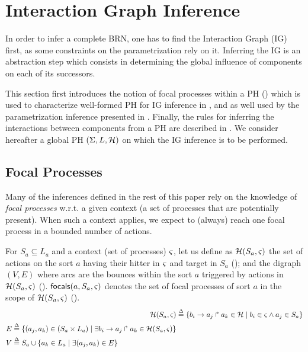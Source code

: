 \section{Interaction Graph Inference}\label{sec:infer-IG}

In order to infer a complete BRN, one has to find the Interaction Graph (IG) first, as some
constraints on the parametrization rely on it.
Inferring the IG is an abstraction step which consists in determining the global influence of
components on each of its successors.

This section first introduces the notion of focal processes within a PH
() which is used to characterize well-formed PH for IG inference
in , and as well used by the parametrization inference presented in .
Finally, the rules for inferring the interactions between components from a PH are
described in .
We consider hereafter a global PH $(\Sigma,L,\mathcal{H})$ on which the IG inference is to be
performed.



\subsection{Focal Processes}\label{ssec:focal}

Many of the inferences defined in the rest of this paper rely on the knowledge of \emph{focal
processes} w.r.t. a given context (a set of processes that are potentially present).
When such a context applies, we expect to (always) reach one focal process in a bounded number of
actions.

For $S_a\subseteq L_a$ and a context (set of processes) $\varsigma$, let us define as $\mathcal{H}(S_a,\varsigma)$
the set of actions on the sort $a$ having their hitter in $\varsigma$ and target in $S_a$
();
and the digraph $(V, E)$ where arcs are the bounces within the sort $a$ triggered by actions
in $\mathcal{H}(S_a,\varsigma)$ ().
$\mathsf{focals}(a,S_a,\varsigma)$ denotes the set of focal processes of sort $a$ in the scope of
$\mathcal{H}(S_a,\varsigma)$ ().
\begin{align}
\mathcal{H}(S_a,\varsigma) & \stackrel{\Delta}= \{ b_i\rightarrow a_j\Rsh a_k\in\mathcal{H} \mid b_i\in\varsigma \wedge a_j\in S_a \}
\label{eq:PHa-ctx}
\\
\begin{split}
E  & \stackrel{\Delta}= \{(a_j,a_k)\in (S_a \times L_a) \mid 
			\exists b_i\rightarrow a_j\Rsh a_k\in \mathcal{H}(S_a,\varsigma) \}
\\
V & \stackrel{\Delta}= S_a \cup \{ a_k\in L_a\mid \exists (a_j,a_k)\in E\}
\end{split}
\label{eq:bounce-graph}
\end{align}

